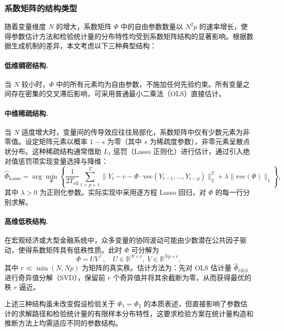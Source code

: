 \subsubsection{系数矩阵的结构类型}

随着变量维度 $N$ 的增大，系数矩阵 $\Phi$ 中的自由参数数量以 $N^2 p$ 的速率增长，使得参数估计方法和检验统计量的分布特性均受到系数矩阵结构的显著影响。根据数据生成机制的差异，本文考虑以下三种典型结构：

\paragraph{低维稠密结构.}
当 $N$ 较小时，$\Phi$ 中的所有元素均为自由参数，不施加任何先验约束。所有变量之间存在密集的交叉滞后影响，可采用普通最小二乘法（OLS）直接估计。

\paragraph{中维稀疏结构.}
当 $N$ 适度增大时，变量间的传导效应往往局部化，系数矩阵中仅有少数元素为非零值。设定矩阵元素以概率 $1 - s$ 为零（其中 $s$ 为稀疏度参数），非零元素呈散点状分布。这种稀疏结构通常借助 $L_1$ 惩罚（Lasso 正则化）进行估计，通过引入绝对值惩罚项实现变量选择与降维：
\begin{equation}\label{eq:lasso}
    \hat{\Phi}_{\text{Lasso}} = \arg\min_{\Phi} \left\{ \frac{1}{2T_{\text{eff}}} \sum_{t=p+1}^{T} \|Y_t - c - \Phi \cdot \mathrm{vec}(Y_{t-1}, \ldots, Y_{t-p})\|_2^2 + \lambda \|\mathrm{vec}(\Phi)\|_1 \right\},
\end{equation}
其中 $\lambda > 0$ 为正则化参数。实际实现中采用逐方程 Lasso 回归，对 $\Phi$ 的每一行分别求解。

\paragraph{高维低秩结构.}
在宏观经济或大型金融系统中，众多变量的协同波动可能由少数潜在公共因子驱动，使得系数矩阵具有低秩性质。此时 $\Phi$ 可分解为
\begin{equation}\label{eq:lowrank}
    \Phi = U V^\top, \quad U \in \mathbb{R}^{N \times r},\; V \in \mathbb{R}^{Np \times r},
\end{equation}
其中 $r \ll \min(N, Np)$ 为矩阵的真实秩。估计方法为：先对 OLS 估计量 $\hat{\Phi}_{\text{OLS}}$ 进行奇异值分解（SVD），保留前 $r$ 个奇异值并将其余截断为零，从而获得最优的秩 $r$ 逼近。

上述三种结构虽未改变假设检验关于 $\Phi_1 = \Phi_2$ 的本质表述，但直接影响了参数估计的求解路径和检验统计量的有限样本分布特性，这要求检验方案在统计量构造和推断方法上均需适应不同的参数结构。


